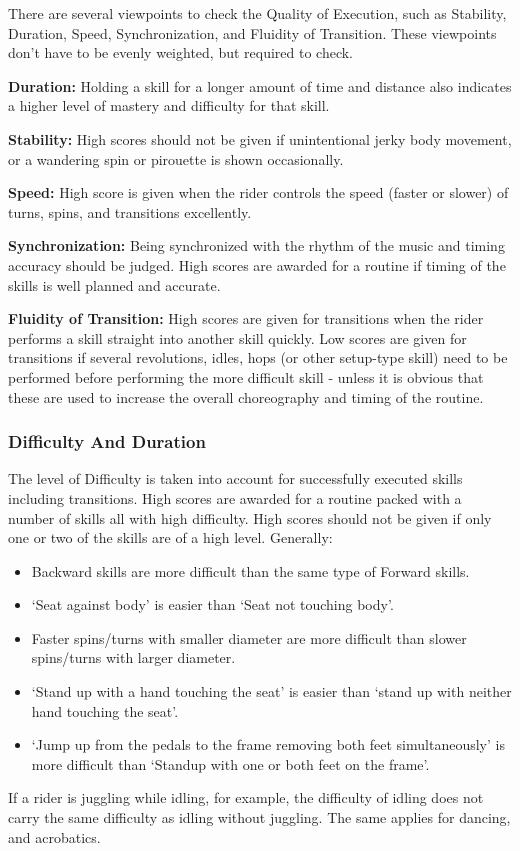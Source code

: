 There are several viewpoints to check the Quality of Execution, such as Stability, Duration, Speed, Synchronization, and Fluidity of Transition.
These viewpoints don't have to be evenly weighted, but required to check.

\textbf{Duration:} Holding a skill for a longer amount of time and distance also indicates a higher level of mastery and difficulty for that skill.

\textbf{Stability:} High scores should not be given if unintentional jerky body movement, or a wandering spin or pirouette is shown occasionally.

\textbf{Speed:} High score is given when the rider controls the speed (faster or slower) of turns, spins, and transitions excellently.

\textbf{Synchronization:} Being synchronized with the rhythm of the music and timing accuracy should be judged.
High scores are awarded for a routine if timing of the skills is well planned and accurate.

\textbf{Fluidity of Transition:} High scores are given for transitions when the rider performs a skill straight into another skill quickly.
Low scores are given for transitions if several revolutions, idles, hops (or other setup-type skill) need to be performed before performing the more difficult skill - unless it is obvious that these are used to increase the overall choreography and timing of the routine.

\subsubsection{Difficulty And Duration}
The level of Difficulty is taken into account for successfully executed skills including transitions.
High scores are awarded for a routine packed with a number of skills all with high difficulty.
High scores should not be given if only one or two of the skills are of a high level.
Generally:
\begin{itemize} 
\item Backward skills are more difficult than the same type of Forward skills.
\item `Seat against body' is easier than `Seat not touching body'.
\item Faster spins/turns with smaller diameter are more difficult than slower spins/turns with larger diameter.
\item `Stand up with a hand touching the seat' is easier than `stand up with neither hand touching the seat'.
\item `Jump up from the pedals to the frame removing both feet simultaneously' is more difficult than `Standup with one or both feet on the frame'.
\end{itemize}
If a rider is juggling while idling, for example, the difficulty of idling does not carry the same difficulty as idling without juggling.
The same applies for dancing, and acrobatics.

